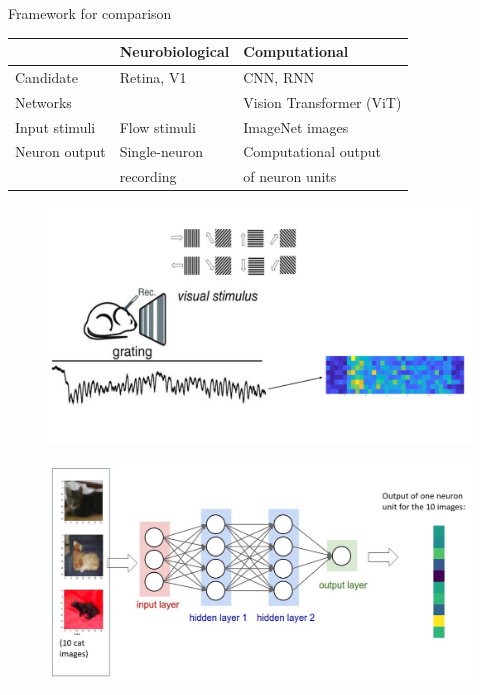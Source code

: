 \documentclass[xcolor={dvipsnames,svgnames}]{beamer}
\begin{document}
\begin{frame}{Framework for comparison}
    \begin{table}[]
\begin{tabular}{|l|l|l|}
\hline
              & Neurobiological & Computational     \\ \hline
Candidate    & Retina, V1      & CNN, RNN \\ 
Networks      &                 & Vision Transformer (ViT) \\\hline
Input stimuli & Flow stimuli \cite{visual-flow}  & ImageNet images \cite{deng2009imagenet} \\ \hline
Neuron output & Single-neuron   & Computational output \\ 
              & recording       & of neuron units \\ \hline
\end{tabular}
\end{table}

\begin{minipage}[t]{.45\linewidth}  
    \begin{figure}
            \includegraphics[width=\textwidth]{presentation/Slide5.jpg}
        \end{figure} 
    \end{minipage}
      \begin{minipage}[t]{.45\linewidth}   
      \begin{figure}         \includegraphics[width=\textwidth]{presentation/Slide1.jpg}
            \end{figure} 
    \end{minipage}
    
\end{frame}
\end{document}
